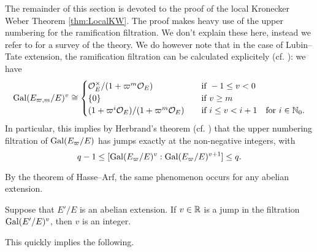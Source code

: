 \documentclass[../main.tex]{subfiles}
\begin{document}
The remainder of this section is devoted to the proof of the local Kronecker Weber 
Theorem \ref{thm:LocalKW}.
The proof makes heavy use of the upper numbering for the ramification filtration.
We don't explain these here, instead we refer to \cite[Chapter
IV]{serre2013local} for a survey of the theory. We
do however note that in the case of Lubin--Tate extension, the 
ramification filtration can be calculated explicitely (cf. \cite[Theorem
2]{gold1981local}): we have
\begin{equation}\label{eq:CalculationOfUpperRamificationFiltration}
  \operatorname{Gal}(E_{\varpi, m}/E)^v \cong \begin{cases}
    \mathcal{O}_E^\times/(1 + \varpi^m \mathcal{O}_E) \quad &\text{if } -1 \leq v < 0 \\
    \{0\} \quad &\text{if } v \geq m \\
    (1 + \varpi^i \mathcal{O}_E)/(1+\varpi^m \mathcal{O}_E) \quad &\text{if } i \leq v < i+1
    \quad \text{for } i \in \mathbb{N}_0.
  \end{cases}
\end{equation}
In particular, this implies by Herbrand's theorem (cf. \cite[Ch. 4, Proposition
14]{serre2013local}) that the upper numbering filtration of 
$\operatorname{Gal}(E_\varpi/E)$ has jumps exactly at the non-negative integers, with
\begin{equation*}
  q-1 \leq [\operatorname{Gal}(E_\varpi/E)^{v} : \operatorname{Gal}(E_\varpi/E)^{v+1}] \leq q.
\end{equation*}

By the theorem of Hasse--Arf, the same phenomenon occurs for any abelian extension.
\begin{thm}\label{thm:Hasse--Arf}
  Suppose that $E'/E$ is an abelian extension. If $v \in \mathbb{R}$ is a jump in the 
  filtration $\operatorname{Gal}(E'/E)^v$, then $v$ is an integer.
\end{thm}

This quickly implies the following.
\end{document}
